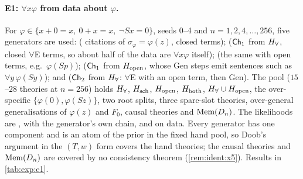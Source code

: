 \paragraph{E1: $\forall x\varphi$ from data about $\varphi$.}
For $\varphi\in\{x+0=x,\ 0+x=x,\ \neg Sx=0\}$, seeds 0--4 and $n=1,2,4,\dots,256$, five generators are used:  (\Lzero{} citations of $\sigma_\varphi=\varphi(z)$, closed terms);  ($\mathsf{Ch}_{1}$ from $H_{\forall}$, closed $\forall$E terms, so about half of the data are $\forall x\varphi$ itself);  (the same with open terms, e.g.\ $\varphi(Sp)$);  ($\mathsf{Ch}_{1}$ from $H_{\mathrm{open}}$, whose Gen steps emit sentences such as $\forall y\,\varphi(Sy)$); and  ($\mathsf{Ch}_{2}$ from $H_{\forall}$: $\forall$E with an open term, then Gen). The pool ($15$--$28$ theories at $n=256$) holds $H_{\forall}$, $H_{\mathrm{sch}}$, $H_{\mathrm{open}}$, $H_{\mathrm{both}}$, $H_{\forall}\cup H_{\mathrm{open}}$, the over-specific $\{\varphi(0),\varphi(Sz)\}$, two root splits, three spare-slot theories, over-general generalisations of $\varphi(z)$ and $F_0$, causal theories and $\mathrm{Mem}(D_n)$. The likelihoods are \Lzero, \Lone{} with the generator's own chain, and \Lselc{} on  data. Every generator has one component and is an atom of the prior in the fixed hand pool, so Doob's argument in the $(T,w)$ form covers the hand theories; the causal theories and $\mathrm{Mem}(D_n)$ are covered by no consistency theorem (\cref{rem:ident:x5}). Results in \cref{tab:exp:e1}.

